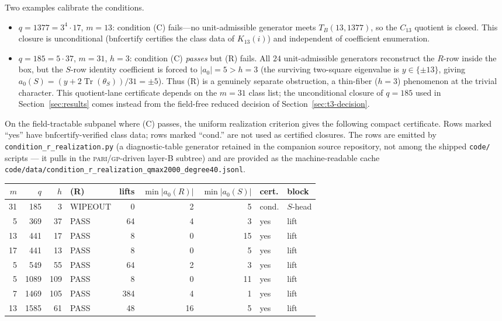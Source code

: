 \documentclass[11pt]{article}
\theoremstyle{plain}
\theoremstyle{definition}
\theoremstyle{remark}
\newcommand{\Tr}{\operatorname{Tr}}
\begin{document}
Two examples calibrate the conditions.
\begin{itemize}
\item $q=1377=3^4\cdot17$, $m=13$: condition (C) fails---no unit-admissible
  generator meets $T_B(13,1377)$, so the $C_{13}$ quotient is closed. This
  closure is unconditional ($\mathrm{bnfcertify}$ certifies the class data of
  $K_{13}(i)$) and independent of coefficient enumeration.
\item $q=185=5\cdot37$, $m=31$, $h=3$: condition (C) \emph{passes} but (R)
  fails. All $24$ unit-admissible generators reconstruct the $R$-row inside the
  box, but the $S$-row identity coefficient is forced to $|a_0|=5>h=3$ (the
  surviving two-square eigenvalue is $y\in\{\pm13\}$, giving
  $a_0(S)=(y+2\Tr(\theta_S))/31=\pm5$). Thus (R) is a genuinely separate
  obstruction, a thin-fiber ($h=3$) phenomenon at the trivial character. This
  quotient-lane certificate depends on the $m=31$ class list; the unconditional
  closure of $q=185$ used in Section~\ref{sec:results} comes instead from the
  field-free reduced decision of Section~\ref{sec:t3-decision}.
\end{itemize}

On the field-tractable subpanel where (C) passes, the uniform realization
criterion gives the following compact certificate. Rows marked ``yes'' have
$\mathrm{bnfcertify}$-verified class data; rows marked ``cond.'' are not used as
certified closures. The rows are emitted by
\texttt{condition\_r\_realization.py} (a diagnostic-table generator
retained in the companion source repository, not among the shipped
\texttt{code/} scripts --- it pulls in the \textsc{pari/gp}-driven
layer-B subtree) and are provided as the machine-readable cache
\texttt{code/data/condition\_r\_realization\_qmax2000\_degree40.jsonl}.

\begin{center}
\small
\begin{tabular}{r r r l r r r l l}
$m$ & $q$ & $h$ & (R) & lifts & $\min|a_0(R)|$ & $\min|a_0(S)|$ & cert. & block\\
\hline
31 & 185  & 3   & WIPEOUT & 0   & 2  & 5  & cond. & $S$-head\\
5  & 369  & 37  & PASS    & 64  & 4  & 3  & yes   & lift\\
13 & 441  & 17  & PASS    & 8   & 0  & 15 & yes   & lift\\
17 & 441  & 13  & PASS    & 8   & 0  & 5  & yes   & lift\\
5  & 549  & 55  & PASS    & 64  & 2  & 3  & yes   & lift\\
5  & 1089 & 109 & PASS    & 8   & 0  & 11 & yes   & lift\\
7  & 1469 & 105 & PASS    & 384 & 4  & 1  & yes   & lift\\
13 & 1585 & 61  & PASS    & 48  & 16 & 5  & yes   & lift\\
\end{tabular}
\end{center}
\end{document}
